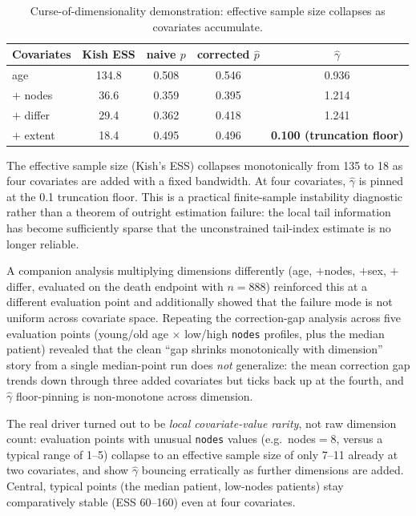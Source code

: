 \documentclass[11pt]{article}
\begin{document}
\begin{table}[h]
\centering
\caption{Curse-of-dimensionality demonstration: effective sample size collapses as covariates accumulate.}
\begin{tabular}{lcccc}
\toprule
Covariates & Kish ESS & naive $p$ & corrected $\hat p$ & $\hat\gamma$ \\
\midrule
age & 134.8 & 0.508 & 0.546 & 0.936 \\
$+$ nodes & 36.6 & 0.359 & 0.395 & 1.214 \\
$+$ differ & 29.4 & 0.362 & 0.418 & 1.241 \\
$+$ extent & 18.4 & 0.495 & 0.496 & \textbf{0.100 (truncation floor)} \\
\bottomrule
\end{tabular}
\end{table}

The effective sample size (Kish's ESS) collapses monotonically from 135 to 18 as
four covariates are added with a fixed bandwidth. At four covariates, $\hat\gamma$ is pinned at the 0.1 truncation floor. This is a
practical finite-sample instability diagnostic rather than a theorem of outright
estimation failure: the local tail information has become sufficiently sparse that
the unconstrained tail-index estimate is no longer reliable.

A companion analysis multiplying dimensions differently (age, $+$nodes, $+$sex,
$+$differ, evaluated on the death endpoint with $n=888$) reinforced this at a
different evaluation point and additionally showed that the failure mode is not
uniform across covariate space. Repeating the correction-gap analysis across five
evaluation points (young/old age $\times$ low/high \texttt{nodes} profiles, plus
the median patient) revealed that the clean ``gap shrinks monotonically with
dimension'' story from a single median-point run does \emph{not} generalize: the
mean correction gap trends down through three added covariates but ticks back up
at the fourth, and $\hat\gamma$ floor-pinning is non-monotone across dimension.

The real driver turned out to be \emph{local covariate-value rarity}, not raw
dimension count: evaluation points with unusual \texttt{nodes} values (e.g.\
nodes$=8$, versus a typical range of 1--5) collapse to an effective sample size of
only 7--11 already at two covariates, and show $\hat\gamma$ bouncing erratically as
further dimensions are added. Central, typical points (the median patient,
low-nodes patients) stay comparatively stable (ESS 60--160) even at four
covariates.
\end{document}
